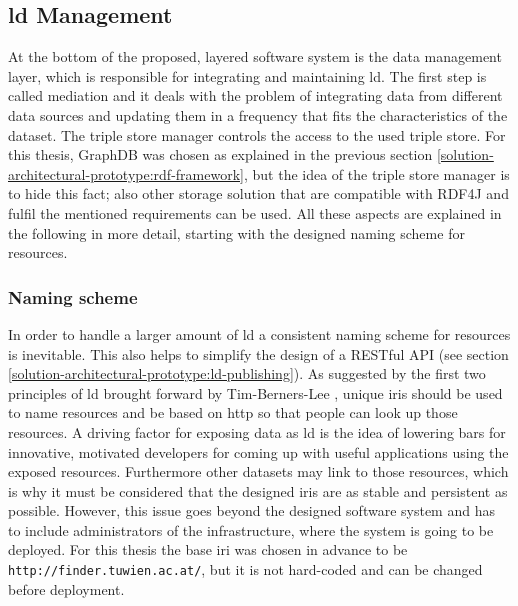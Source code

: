 \documentclass[draft,final]{vutinfth} %
\begin{document}
\subsection{\gls{ld} Management}
\label{solution-architectural-prototype:ld-management}
At the bottom of the proposed, layered software system is the data management layer, which is responsible for integrating and maintaining \gls{ld}. The first step is called mediation and it deals with the problem of integrating data from different data sources and updating them in a frequency that fits the characteristics of the dataset. The triple store manager controls the access to the used triple store. For this thesis, GraphDB was chosen as explained in the previous section \ref{solution-architectural-prototype:rdf-framework}, but the idea of the triple store manager is to hide this fact; also other storage solution that are compatible with RDF4J and fulfil the mentioned requirements can be used. All these aspects are explained in the following in more detail, starting with the designed naming scheme for resources.


\subsubsection{Naming scheme}
In order to handle a larger amount of \gls{ld} a consistent naming scheme for resources is inevitable. This also helps to simplify the design of a RESTful API (see section \ref{solution-architectural-prototype:ld-publishing}). As suggested by the first two principles of \gls{ld} brought forward by Tim-Berners-Lee \cite{berners-lee_linked_2009}, unique \gls{iri}s should be used to name resources and be based on \gls{http} so that people can look up those resources. A driving factor for exposing data as \gls{ld} is the idea of lowering bars for innovative, motivated developers for coming up with useful applications using the exposed resources. Furthermore other datasets may link to those resources, which is why it must be considered that the designed \gls{iri}s are as stable and persistent as possible. However, this issue goes beyond the designed software system and has to include administrators of the infrastructure, where the system is going to be deployed. For this thesis the base \gls{iri} was chosen in advance to be \texttt{http://finder.tuwien.ac.at/}, but it is not hard-coded and can be changed before deployment.
\end{document}

